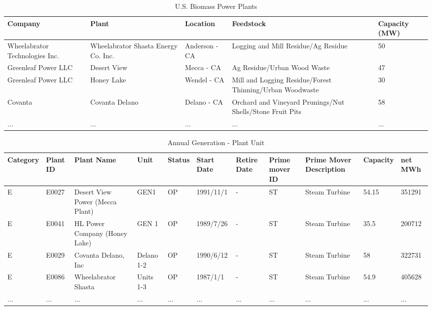 \begin{itemize}
	

\begin{table*}[!ht]
	\setlength\extrarowheight{2pt} %
	\begin{tabular}{ |l|p{2cm}|p{3cm}|p{2cm}|l|  }
		\hline
		\textbf{Company}&	\textbf{Plant}&	\textbf{Location}&	\textbf{Feedstock}&	\textbf{Capacity (MW)}\\
		\hline
		Wheelabrator Technologies Inc.& 	Wheelabrator Shasta Energy Co. Inc.& 	Anderson - CA& 	Logging and Mill Residue/Ag Residue& 	50\\
		\hline
		Greenleaf Power LLC& 	Desert View& 	Mecca - CA& 	Ag Residue/Urban Wood Waste& 	47\\
		\hline
		Greenleaf Power LLC& 	Honey Lake& 	Wendel - CA&	Mill and Logging Residue/Forest Thinning/Urban Woodwaste& 	30\\
		\hline
		Covanta& 	Covanta Delano& 	Delano - CA& 	Orchard and Vineyard Prunings/Nut Shells/Stone Fruit Pits& 	58\\
		\hline
		... & ... & ... & ... & ...\\
		\hline
		
	\end{tabular}
	\vspace{.2cm}
	\caption{U.S. Biomass Power Plants\label{tab:q1-result1}}
\end{table*}
	

\begin{table*}[!ht]
	\setlength\extrarowheight{2pt} %
	\begin{tabular}{ |l|p{1cm}|p{2cm}|p{1cm}|l|p{2cm}|p{1cm}|p{2cm}|p{2cm}|p{1cm}|p{1cm}|  }
		\hline
		Category& 	Plant ID& 	Plant Name& 	Unit& 	Status& 	Start Date& 	Retire Date& 	Prime mover ID& Prime Mover Description& Capacity& net MWh\\
		\hline
		 E& E0027& 	Desert View Power (Mecca Plant)& 	GEN1& 	OP& 	1991/11/1& 	-	&ST& 	Steam Turbine& 	54.15& 	351291\\
		 \hline
		 E & 	E0041& 	HL Power Company (Honey Lake)& 	GEN 1& 	OP& 	1989/7/26& 	-	&ST& 	Steam Turbine& 	35.5& 	200712\\
		 \hline
		 E& E0029& 	Covanta Delano, Inc& 	Delano 1-2& 	OP& 	1990/6/12& 	- &ST& 	Steam Turbine& 	58& 	322731\\
		 \hline
		 E& 	E0086& 	Wheelabrator Shasta& 	Units 1-3& 	OP& 	1987/1/1& 	-	&ST& 	Steam Turbine& 	54.9& 	405628\\
		 \hline
		 ... & ... & ... & ... & ... & ... & ... & ... & ... & ... & ... \\
		 
		\hline
		
		
	\end{tabular}
	\vspace{.2cm}
	\caption{Annual Generation - Plant Unit\label{tab:q1-result2}}
\end{table*}

\end{itemize}
